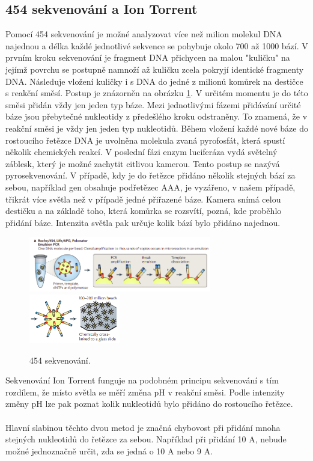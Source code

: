 \documentclass[czech,DP]{thesiskiv}
\numberwithin{equation}{section}
\begin{document}
\subsection{454 sekvenování a Ion Torrent}
Pomocí 454 sekvenování je možné analyzovat více než milion molekul DNA najednou a délka každé jednotlivé sekvence se pohybuje okolo 700 až 1000 bází. V prvním kroku sekvenování je fragment DNA přichycen na malou "kuličku" \space na jejímž povrchu se postupně namnoží až kuličku zcela pokryjí identické fragmenty DNA. Následuje vložení kuličky i s DNA do jedné z milionů komůrek na destičce s reakční směsí. Postup je znázorněn na obrázku \ref{fig:sekvenovani_454}. V určitém momentu je do této směsi přidán vždy jen jeden typ báze. Mezi jednotlivými fázemi přidávání určité báze jsou přebytečné nukleotidy z předešlého kroku odstraněny. To znamená, že v reakční směsi je vždy jen jeden typ nukleotidů. Během vložení každé nové báze do rostoucího řetězce DNA je uvolněna molekula zvaná pyrofosfát, která spustí několik chemických reakcí. V poslední fázi enzym luciferáza vydá světelný záblesk, který je možné zachytit citlivou kamerou. Tento postup se nazývá pyrosekvenování. V případě, kdy je do řetězce přidáno několik stejných bází za sebou, například gen obsahuje podřetězec AAA, je vyzářeno, v našem případě, třikrát více světla než v případě jedné přiřazené báze. Kamera snímá celou destičku a na základě toho, která komůrka se rozsvítí, pozná, kde proběhlo přidání báze. Intenzita světla pak určuje kolik bází bylo přidáno najednou. 


\begin{figure}[H]		
		\centering
		\includegraphics[width=300px]{./img/sekvenace_454_1.png}
		\includegraphics[width=150px]{./img/sekvenace_454_2.png}
		\caption{454 sekvenování. \cite{ngs_merzker}}
		\label{fig:sekvenovani_454}
\end{figure}

\noindent
Sekvenování Ion Torrent funguje na podobném principu sekvenování s tím rozdílem, že místo světla se měří změna pH v reakční směsi. Podle intenzity změny pH lze pak poznat kolik nukleotidů bylo přidáno do rostoucího řetězce.
\\
\\
Hlavní slabinou těchto dvou metod je značná chybovost při přidání mnoha stejných nukleotidů do řetězce za sebou. Například při přidání 10 A, nebude možné jednoznačně určit, zda se jedná o 10 A nebo 9 A.
\end{document}
